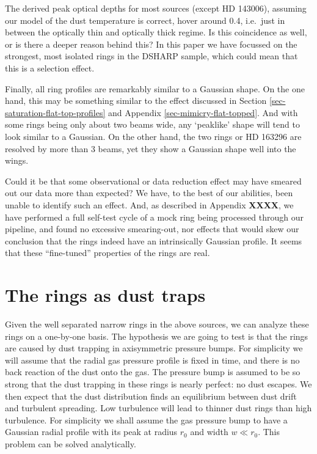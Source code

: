 \documentclass{aa}
\begin{document}
The derived peak optical depths for most sources (except HD 143006), assuming
our model of the dust temperature is correct, hover around 0.4, i.e.\ just in
between the optically thin and optically thick regime. Is this coincidence as
well, or is there a deeper reason behind this? In this paper we have focussed on
the strongest, most isolated rings in the DSHARP sample, which could mean that
this is a selection effect.

Finally, all ring profiles are remarkably similar to a Gaussian shape. On the
one hand, this may be something similar to the effect discussed in Section
\ref{sec-saturation-flat-top-profiles} and Appendix
\ref{sec-mimicry-flat-topped}. And with some rings being only about two beams
wide, any `peaklike' shape will tend to look similar to a Gaussian. On the other
hand, the two rings or HD 163296 are resolved by more than 3 beams, yet they
show a Gaussian shape well into the wings.

Could it be that some observational or data reduction effect may have smeared
out our data more than expected? We have, to the best of our abilities, been
unable to identify such an effect. And, as described in Appendix {\bf XXXX}, we
have performed a full self-test cycle of a mock ring being processed through our
pipeline, and found no excessive smearing-out, nor effects that would skew our
conclusion that the rings indeed have an intrinsically Gaussian profile. It seems
that these ``fine-tuned'' properties of the rings are real. 

\section{The rings as dust traps}
\label{sec-rings-as-dust-traps}
%
Given the well separated narrow rings in the above sources, we can analyze these
rings on a one-by-one basis. The hypothesis we are going to test is that the
rings are caused by dust trapping in axisymmetric pressure bumps. For simplicity
we will assume that the radial gas pressure profile is fixed in time, and there
is no back reaction of the dust onto the gas. The pressure bump is assumed to be
so strong that the dust trapping in these rings is nearly perfect: no dust
escapes. We then expect that the dust distribution finds an equilibrium between
dust drift and turbulent spreading. Low turbulence will lead to thinner dust
rings than high turbulence. For simplicity we shall assume the gas pressure bump
to have a Gaussian radial profile with its peak at radius $r_0$ and width $w\ll
r_0$. This problem can be solved analytically.
\end{document}
